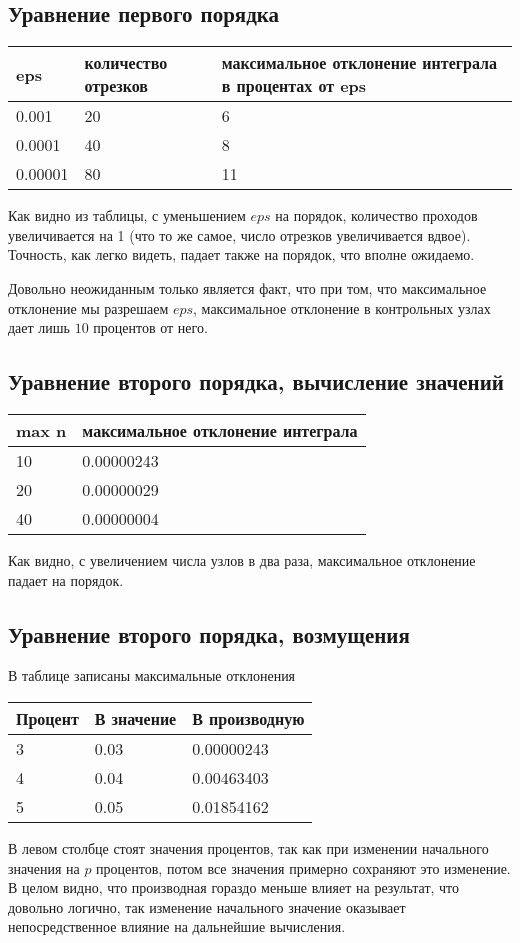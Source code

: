 \documentclass[paper=a4, fontsize=11pt]{scrartcl} %
\numberwithin{equation}{section} %
\numberwithin{figure}{section} %
\numberwithin{table}{section} %
\begin{document}
\subsection{Уравнение первого порядка}

\begin{tabular}{|p{4 cm}|p{4 cm}|p{4 cm}|}
\hline
	eps & количество отрезков & максимальное отклонение интеграла в процентах от eps \\
\hline 
	0.001 & 20 & 6\\
\hline 
	0.0001 & 40 & 8\\
\hline
	0.00001 & 80 & 11\\
\hline
\end{tabular}

Как видно из таблицы, с уменьшением $eps$ на порядок, количество проходов увеличивается на 1 (что то же самое, число отрезков увеличивается вдвое). Точность, как легко видеть, падает также на порядок, что вполне ожидаемо.

Довольно неожиданным только является факт, что при том, что максимальное отклонение мы разрешаем $eps$, максимальное отклонение в контрольных узлах дает лишь $10$ процентов от него.

\subsection{Уравнение второго порядка, вычисление значений}

\begin{tabular}{|p{4 cm}|p{4 cm}|}
\hline
	max n & максимальное отклонение интеграла\\
\hline 
	10 & 0.00000243 \\
\hline 
	20 & 0.00000029 \\
\hline
	40 & 0.00000004 \\
\hline
\end{tabular}

Как видно, с увеличением числа узлов в два раза, максимальное отклонение падает на порядок.

\subsection{Уравнение второго порядка, возмущения}

В таблице записаны максимальные отклонения

\begin{tabular}{|p{4 cm}|p{4 cm}|p{4 cm}|}
\hline
	Процент & В значение &  В производную \\
\hline 
	3 & 0.03 & 0.00000243\\
\hline 
	4 & 0.04 & 0.00463403\\
\hline
	5 & 0.05 & 0.01854162\\
\hline
\end{tabular}

В левом столбце стоят значения процентов, так как при изменении начального значения на $p$ процентов, потом все значения примерно сохраняют это изменение.
В целом видно, что производная гораздо меньше влияет на результат, что довольно логично, так изменение начального значение оказывает непосредственное влияние на дальнейшие вычисления.
\end{document}
